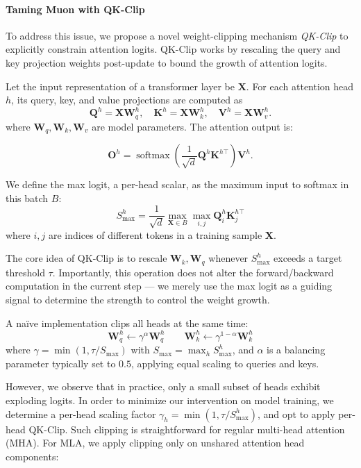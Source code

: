 \paragraph{Taming Muon with QK-Clip}
To address this issue, we propose a novel weight-clipping mechanism \textit{QK-Clip} to explicitly constrain attention logits. QK-Clip works by rescaling the query and key projection weights post-update to bound the growth of attention logits.
 
Let the input representation of a transformer layer be $\mathbf X$. For each attention head $h$, its query, key, and value projections are computed as
\[
\mathbf{Q}^{h} = \mathbf X \mathbf W_q^{h}, \quad
\mathbf K^{h} = \mathbf X \mathbf W_k^{h}, \quad
\mathbf V^{h} = \mathbf X \mathbf W_v^{h}.
\]
where $\mathbf W_q, \mathbf W_k, \mathbf W_v$ are model parameters. The attention output is:

\[
\mathbf O^{h} = \operatorname{softmax}\left( \frac{1}{\sqrt{d}} \mathbf Q^{h} \mathbf K^{h\top} \right) \mathbf V^{h}.
\]

We define the max logit, a per-head scalar, as the maximum input to softmax in this batch $B$:
\[
S_{\max}^{h} = \frac{1}{\sqrt{d}} \max_{\mathbf X \in B} \max_{i,j} \mathbf Q_i^{h} \mathbf K_j^{h\top} 
\]
where $i,j$ are indices of different tokens in a training sample $\mathbf X$.



The core idea of QK-Clip is to rescale $\mathbf W_k, \mathbf W_q$ whenever $S_{\max}^{h}$ exceeds a target threshold $\tau$. Importantly, this operation does not alter the forward/backward computation in the current step --- we merely use the max logit as a guiding signal to determine the strength to control the weight growth.

A naïve implementation clips all heads at the same time:
\begin{equation*}
  \mathbf W_q^{h} \gets \gamma^{\alpha} \mathbf  W_q^{h} \qquad
  \mathbf W_k^{h} \gets  \gamma^{1-\alpha} \mathbf W_k^{h}
\end{equation*}
where $\gamma = \min(1, \tau / S_{\max})$ with $S_{\max} = \max_h S_{\max}^{h}$, and $\alpha$ is a balancing parameter typically set to $0.5$, applying equal scaling to queries and keys. 

However, we observe that in practice, only a small subset of heads exhibit exploding logits. In order to minimize our intervention on model training, we determine a per-head scaling factor $\gamma_h = \min(1, \tau / S_{\max}^h) $, and opt to apply per-head QK-Clip. Such clipping is straightforward for regular multi-head attention (MHA). For MLA, we apply clipping only on unshared attention head components:

